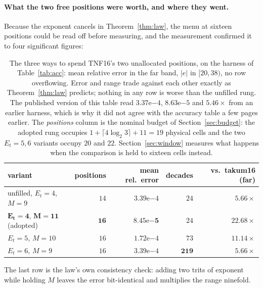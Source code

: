 \paragraph{What the two free positions were worth, and where they went.} Because
the exponent cancels in Theorem~\ref{thm:law}, the menu at sixteen positions could
be read off before measuring, and the measurement confirmed it to four significant
figures:

\begin{table}[t]\centering
\caption{The three ways to spend TNF16's two unallocated positions, on the
harness of Table~\ref{tab:acc}: mean relative error in the far band, $|e|$ in
$[20,38)$, no row overflowing. Error and range trade against each other exactly
as Theorem~\ref{thm:law} predicts; nothing in any row is worse than the unfilled
rung. The published version of this table read $3.37\mathrm{e}{-4}$,
$8.63\mathrm{e}{-5}$ and $5.46\times$ from an earlier harness, which is why it did
not agree with the accuracy table a few pages earlier. The \emph{positions} column
is the nominal budget of Section~\ref{sec:budget}: the adopted rung occupies
$1+\lceil 4\log_2 3\rceil+11=19$ physical cells and the two $E_t{=}5,6$ variants
occupy $20$ and $22$. Section~\ref{sec:window} measures what happens when the
comparison is held to sixteen cells instead.}
\label{tab:tnf16-fill}
\begin{tabular}{lrrrr}
\toprule
variant & positions & mean rel.\ error & decades & vs.\ takum16 (far) \\
\midrule
unfilled, $E_t{=}4$, $M{=}9$  & $14$ & $3.39\mathrm{e}{-4}$ & $24$  & $5.66\times$ \\
$\mathbf{E_t{=}4}$, $\mathbf{M{=}11}$ (adopted) & $\mathbf{16}$ & $\mathbf{8.45\mathrm{e}{-5}}$ & $24$ & $\mathbf{22.68\times}$ \\
$E_t{=}5$, $M{=}10$           & $16$ & $1.72\mathrm{e}{-4}$ & $73$  & $11.14\times$ \\
$E_t{=}6$, $M{=}9$            & $16$ & $3.39\mathrm{e}{-4}$ & $\mathbf{219}$ & $5.66\times$ \\
\bottomrule
\end{tabular}
\end{table}

The last row is the law's own consistency check: adding two trits of exponent
while holding $M$ leaves the error bit-identical and multiplies the range
ninefold.

